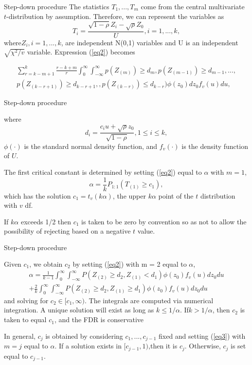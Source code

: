 \documentclass{beamer}
\begin{document}
\begin{frame}[t]{Step-down procedure}\vspace{10pt}
The statistics $T_1,...,T_m$ come from the central multivariate $t$-distribution by assumption. Therefore, we can represent the variables as
$$ T_i = \frac{\sqrt{1-\rho}Z_i-\sqrt{\rho}Z_0}{U}, i=1,...,k,$$
where$Z_i, i=1,...,k$, are independent N(0,1) variables and U is an independent $\sqrt{\chi^2/v}$ variable. Expression (\ref{eq2}) becomes

\begin{multline}\label{eq3}
 \sum_{r=k-m+1}^k \frac{r-k+m}{r} \int_0^{\infty}\int_{-\infty}^{\infty} p(Z_{(m)}) \geq d_m, p(Z_{(m-1)}) \geq d_{m-1},...,\\
 p(Z_{(k-r+1)}) \geq d_{k-r+1},,p(Z_{(k-r)}) \leq d_{k-r}) \phi(z_0) dz_0f_v(u)du,
\end{multline}
\end{frame}

\begin{frame}[t]{Step-down procedure}\vspace{10pt}

where 
$$ d_i=\frac{c_iu+ \sqrt{\rho} z_0}{\sqrt{1-\rho}}, 1\leq i \leq k, $$
$\phi(\cdot)$ is the standard normal density function, and $f_v(\cdot)$ is the density function of $U$. 

The first critical constant is determined by setting (\ref{eq2}) equal to $\alpha$ with $m=1$,
$$ \alpha = \frac{1}{k}P_{1:1}(T_{(1)} \geq c_1) ,$$
which has the solution $c_1 = t_v(k\alpha)$, the upper $k\alpha$ point of the $t$ distribution with $v$ df. 

If $k\alpha$ exceeds 1/2 then $c_1$ is taken to be zero by convention so as not to allow the possibility of rejecting based on a negative $t$ value.
\end{frame}

\begin{frame}[t]{Step-down procedure}\vspace{10pt}

Given $c_1$, we obtain $c_2$ by setting (\ref{eq2}) with m = 2 equal to $\alpha$,
\begin{multline*}
\alpha = \frac{1}{k-1}\int_0^{\infty}\int_{-\infty}^{\infty}P(Z_{(2)} \geq d_2,Z_{(1)}< d_1)\phi(z_0)f_v(u)dz_0du  \\
+ \frac{2}{k} \int_0^{\infty}\int_{-\infty}^{\infty}P(Z_{(2)} \geq d_2,Z_{(1)} \geq d_1)\phi(z_0)f_v(u)dz_0du
\end{multline*} 
and solving for $c_2 \in [c_1,\infty)$. The integrals are computed via numerical integration. A unique solution will exist as long as $k\leq 1/\alpha$. If$k> 1/\alpha$, then $c_2$ is taken to equal $c_1$, and the FDR is conservative

In general, $c_j$ is obtained by considering $c_1,...,c_{j−1}$ fixed and setting (\ref{eq3}) with $m = j$ equal to $\alpha$.  If a solution exists in $[c_{j-1},1)$,then it is $c_j$. Otherwise, $c_j$ is set equal to $c_{j-1}$.
\end{frame}
\end{document}
